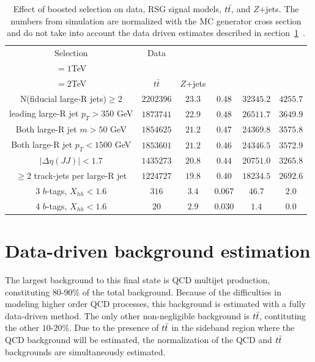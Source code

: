 \begin{table}[h!]
\centering
\captionsetup{justification=centering}

\hspace{-10pt}
\begin{tabular}{c|c|c|c|c|c}
Selection & Data & \specialcell{$m_{\Gkk}$ \\ $=1$TeV} & \specialcell{$m_{\Gkk}$\\ $=2$TeV} & $t\bar{t}$ & $Z$+jets \\
\hline
N(fiducial large-R jets)$\geq 2$ & $2202396$ & $23.3$ & $0.48$ & $32345.2$ & $4255.7$ \\
leading large-R jet $p_{T}>350$ GeV & $1873741$ & $22.9$ & $0.48$ & $26511.7$ & $3649.9$ \\
Both large-R jet $m>50$ GeV & $1854625$ & $21.2$ & $0.47$ & $24369.8$ & $3575.8$ \\
Both large-R jet $p_{T}<1500$ GeV & $1853601$ & $21.2$ & $0.46$ & $24346.5$ & $3572.9$ \\
$|\Delta\eta(JJ)|<1.7$ & $1435273$ & $20.8$ & $0.44$ & $20751.0$ & $3265.8$ \\
$\geq 2$ track-jets per large-R jet & $1224727$ & $19.8$ & $0.40$ & $18234.5$ & $2692.6$ \\
\hline
3 $b$-tags, $X_{hh}<1.6$ & $316$ & $3.4$ & $0.067$ & $46.7$ & $2.0$ \\
\hline
4 $b$-tags, $X_{hh}<1.6$ & $20$ & $2.9$ & $0.030$ & $1.4$ & $0.0$ \\
\hline
\end{tabular}

\caption{
Effect of boosted selection on data, RSG signal models, $t\bar{t}$, and $Z$+jets. The numbers from simulation are normalized with the MC generator cross section and do not take into account the data driven estimates described in section~\ref{sec:dd4b}~\cite{Qi}.
}
\label{tab:4bcutflow}
\end{table}

\section{Data-driven background estimation}
\label{sec:dd4b}

The largest background to this final state is QCD multijet production, constituting $80$-$90$\% of the total background. Because of the difficulties in modeling higher order QCD processes, this background is estimated with a fully data-driven method. The only other non-negligible background is $t\bar{t}$, contituting the other $10$-$20$\%. Due to the presence of $t\bar{t}$ in the sideband region where the QCD background will be estimated, the normalization of the QCD and $t\bar{t}$ backgrounds are simultaneously estimated. 

